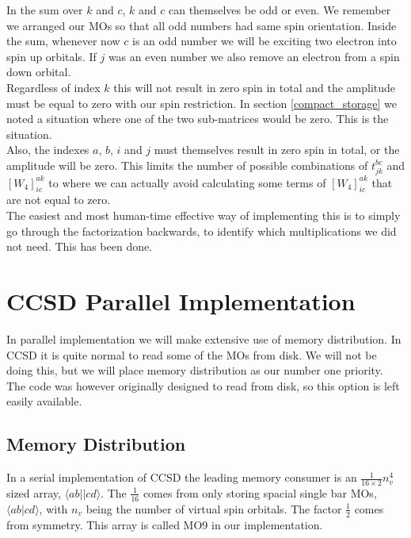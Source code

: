 \documentclass[a4paper,norsk,11pt,twoside]{report}
\begin{document}
In the sum over $k$ and $c$, $k$ and $c$ can themselves be odd or even. We remember we arranged our MOs so that all odd numbers had same spin orientation. Inside the sum, whenever now $c$ is an odd number we will be exciting two electron into spin up orbitals. If $j$ was an even number we also remove an electron from a spin down orbital. \\

Regardless of index $k$ this will not result in zero spin in total and the amplitude must be equal to zero with our spin restriction. In section \ref{compact_storage} we noted a situation where one of the two sub-matrices would be zero. This is the situation. \\

Also, the indexes $a$, $b$, $i$ and $j$ must themselves result in zero spin in total, or the amplitude will be zero. This limits the number of possible combinations of $t_{jk}^{bc}$ and $[W_4]_{ic}^{ak}$ to where we can actually avoid calculating some terms of $[W_4]_{ic}^{ak}$ that are not equal to zero. \\

The easiest and most human-time effective way of implementing this is to simply go through the factorization backwards, to identify which multiplications we did not need. This has been done.

\section{CCSD Parallel Implementation}
In parallel implementation we will make extensive use of memory distribution. In CCSD it is quite normal to read some of the MOs from disk. We will not be doing this, but we will place memory distribution as our number one priority. The code was however originally designed to read from disk, so this option is left easily available.

\subsection{Memory Distribution \label{kriseseksjon}}
In a serial implementation of CCSD the leading memory consumer is an $\frac{1}{16 \times 2} n_v^4$ sized array, $\langle ab||cd \rangle$. The $\frac{1}{16}$ comes from only storing spacial single bar MOs, $\langle ab|cd \rangle$, with $n_v$ being the number of virtual spin orbitals. The factor $\frac{1}{2}$ comes from symmetry. This array is called MO9 in our implementation. \\
\end{document}
